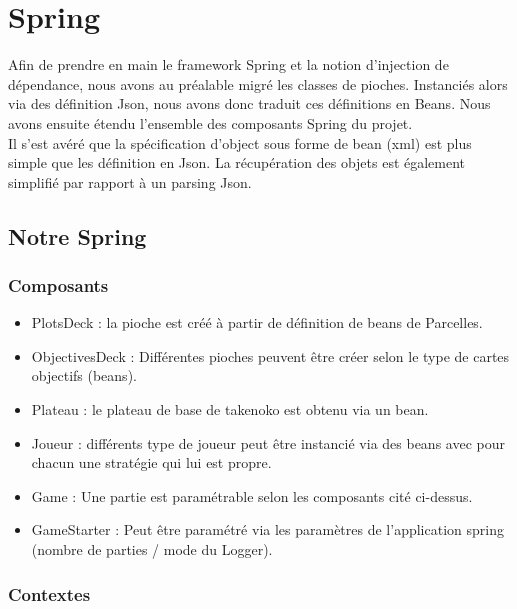 \chapter{Spring}
\label{spring}

Afin de prendre en main le framework Spring et la notion d'injection de dépendance, nous avons au préalable migré les classes de pioches. Instanciés alors via des définition Json, nous avons donc traduit ces définitions en Beans. Nous avons ensuite étendu l'ensemble des composants Spring du projet.\\
Il s'est avéré que la spécification d'object sous forme de bean (xml) est plus simple que les définition en Json. La récupération des objets est également simplifié par rapport à un parsing Json.

\section{Notre Spring}

\subsection{Composants}

\begin{itemize}
    \item PlotsDeck : la pioche est créé à partir de définition de beans de Parcelles.\\
    \item ObjectivesDeck : Différentes pioches peuvent être créer selon le type de cartes objectifs (beans).\\
    \item Plateau : le plateau de base de takenoko est obtenu via un bean.\\
    \item Joueur : différents type de joueur peut être instancié via des beans avec pour chacun une stratégie qui lui est propre.\\
    \item Game : Une partie est paramétrable selon les composants cité ci-dessus.\\
    \item GameStarter : Peut être paramétré via les paramètres de l'application spring (nombre de parties / mode du Logger).
\end{itemize}

\subsection{Contextes}

